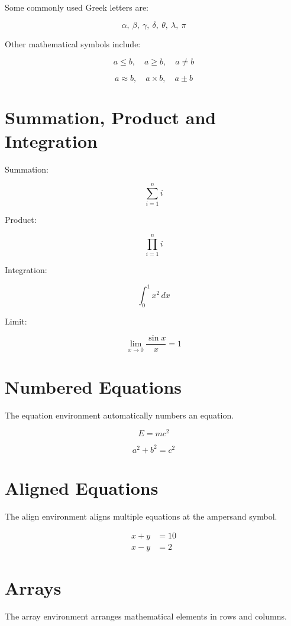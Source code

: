\documentclass[12pt,a4paper]{article}
\begin{document}
Some commonly used Greek letters are:

\[
\alpha,\ \beta,\ \gamma,\ \delta,\ \theta,\ \lambda,\ \pi
\]

Other mathematical symbols include:

\[
a \leq b,\quad a \geq b,\quad a \neq b
\]

\[
a \approx b,\quad a \times b,\quad a \pm b
\]

\section{Summation, Product and Integration}

Summation:

\[
\sum_{i=1}^{n} i
\]

Product:

\[
\prod_{i=1}^{n} i
\]

Integration:

\[
\int_0^1 x^2\,dx
\]

Limit:

\[
\lim_{x\to 0}\frac{\sin x}{x}=1
\]

\section{Numbered Equations}

The equation environment automatically numbers an equation.

\begin{equation}
E=mc^2
\end{equation}

\begin{equation}
a^2+b^2=c^2
\end{equation}

\section{Aligned Equations}

The align environment aligns multiple equations at
the ampersand symbol.

\begin{align}
x+y &= 10 \\
x-y &= 2
\end{align}

\section{Arrays}

The array environment arranges mathematical elements
in rows and columns.
\end{document}
